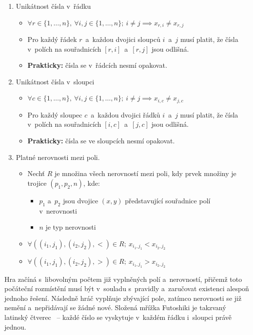 \begin{enumerate}
    \item Unikátnost čísla v~řádku
    \begin{itemize}
        \item \(\forall r \in \{1, \dots, n\},\ \forall i, j \in \{1, \dots, n
            \};\ i \neq j \implies x_{r, i} \neq x_{r, j}\)
        \item Pro každý řádek \(r\)~a~každou dvojici sloupců \(i\)~a~\(j\)
            musí platit, že čísla v~polích na souřadnicích
            \([r, i]\)~a~\([r, j]\) jsou odlišná.
        \item \textbf{Prakticky:} čísla se v~řádcích nesmí opakovat.
    \end{itemize}
    \item Unikátnost čísla v~sloupci
    \begin{itemize}
        \item \(\forall c \in \{1, \dots, n\},\ \forall i, j \in \{1, \dots, n
            \};\ i \neq j \implies x_{i, c} \neq x_{j, c}\)
        \item Pro každý sloupec \(c\)~a~každou dvojici řádků \(i\)~a~\(j\)
            musí platit, že čísla v~polích na souřadnicích
            \([i, c]\)~a~\([j, c]\) jsou odlišná.
        \item \textbf{Prakticky:} čísla se ve sloupcích nesmí opakovat.
    \end{itemize}
    \item Platné nerovnosti mezi poli.
    \begin{itemize}
        \item Nechť \(R\) je množina všech nerovností mezi poli, kdy prvek
            množiny je trojice \((p_1, p_2, n)\), kde:
        \begin{itemize}
            \item \(p_1\) a~\(p_2\) jsou dvojice \((x, y)\) představující
                souřadnice polí v~nerovnosti
            \item \(n\) je typ nerovnosti
        \end{itemize}
        \item \(\forall ((i_1, j_1), (i_2, j_2), <) \in R;\ x_{i_1, j_1} <
            x_{i_2, j_2} \)
        \item \(\forall ((i_1, j_1), (i_2, j_2), >) \in R;\ x_{i_1, j_1} >
            x_{i_2, j_2} \)
    \end{itemize}
\end{enumerate}

Hra začíná s~libovolným počtem již vyplněných polí a~nerovností, přičemž toto
počáteční rozmístění musí být v~souladu s~pravidly a~zaručovat existenci
alespoň jednoho řešení. Následně hráč vyplňuje zbývající pole, zatímco
nerovnosti se již nemění a~nepřidávají se žádné nové. Složená mřížka Futoshiki
je takzvaný latinský čtverec~\cite{LatinSquareWiki} – každé číslo se vyskytuje
v~každém řádku i~sloupci právě jednou.

